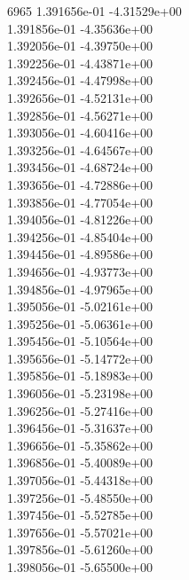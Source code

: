 6965	1.391656e-01	-4.31529e+00	\\ 	1.391856e-01	-4.35636e+00	\\ 	1.392056e-01	-4.39750e+00	\\ 	1.392256e-01	-4.43871e+00	\\ 	1.392456e-01	-4.47998e+00	\\ 	1.392656e-01	-4.52131e+00	\\ 	1.392856e-01	-4.56271e+00	\\ 	1.393056e-01	-4.60416e+00	\\ 	1.393256e-01	-4.64567e+00	\\ 	1.393456e-01	-4.68724e+00	\\ 	1.393656e-01	-4.72886e+00	\\ 	1.393856e-01	-4.77054e+00	\\ 	1.394056e-01	-4.81226e+00	\\ 	1.394256e-01	-4.85404e+00	\\ 	1.394456e-01	-4.89586e+00	\\ 	1.394656e-01	-4.93773e+00	\\ 	1.394856e-01	-4.97965e+00	\\ 	1.395056e-01	-5.02161e+00	\\ 	1.395256e-01	-5.06361e+00	\\ 	1.395456e-01	-5.10564e+00	\\ 	1.395656e-01	-5.14772e+00	\\ 	1.395856e-01	-5.18983e+00	\\ 	1.396056e-01	-5.23198e+00	\\ 	1.396256e-01	-5.27416e+00	\\ 	1.396456e-01	-5.31637e+00	\\ 	1.396656e-01	-5.35862e+00	\\ 	1.396856e-01	-5.40089e+00	\\ 	1.397056e-01	-5.44318e+00	\\ 	1.397256e-01	-5.48550e+00	\\ 	1.397456e-01	-5.52785e+00	\\ 	1.397656e-01	-5.57021e+00	\\ 	1.397856e-01	-5.61260e+00	\\ 	1.398056e-01	-5.65500e+00	\\ \hline
